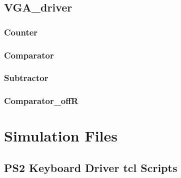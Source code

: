 \documentclass[a4paper]{article}
\begin{document}
\subsection{VGA\_driver}


\subsubsection{Counter}


\subsubsection{Comparator}


\subsubsection{Subtractor}


\subsubsection{Comparator\_offR}







\section{Simulation Files}
\subsection{PS2 Keyboard Driver tcl Scripts}
    
    
\end{document}
